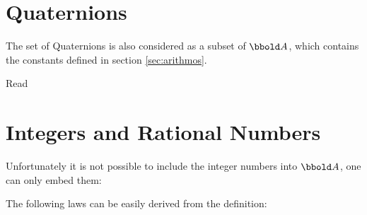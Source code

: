 \documentclass[12pt]{article}
\begin{document}
\section{Quaternions}
\label{sec:quaternions}
The set of Quaternions is also considered as a subset of $\arithmos$,
which contains the constants defined in section \ref{sec:arithmos}.

Read \cite{Mukundan2002,Vince2021}
%
\section{Integers and Rational Numbers}
\label{sec:integers-and-rationals}
Unfortunately it is not possible to include the integer numbers into
$\arithmos$, one can only embed them:


The following laws can be easily derived from the definition:
\end{document}
